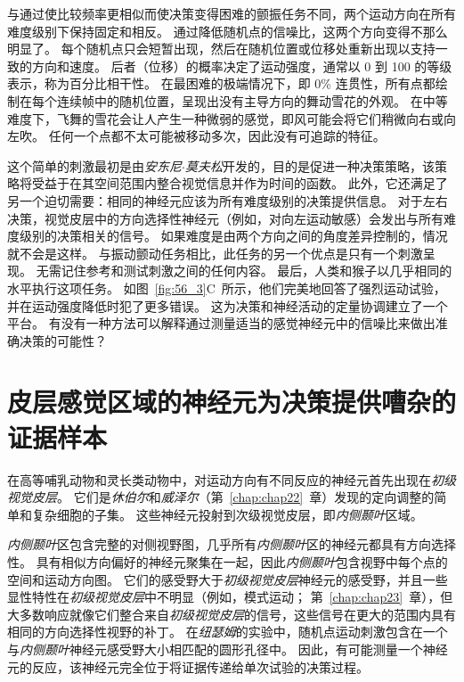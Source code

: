 与通过使比较频率更相似而使决策变得困难的颤振任务不同，两个运动方向在所有难度级别下保持固定和相反。
通过降低随机点的信噪比，这两个方向变得不那么明显了。
每个随机点只会短暂出现，然后在随机位置或位移处重新出现以支持一致的方向和速度。
后者（位移）的概率决定了运动强度，通常以 0 到 100 的等级表示，称为百分比相干性。
在最困难的极端情况下，即 0\% 连贯性，所有点都绘制在每个连续帧中的随机位置，呈现出没有主导方向的舞动雪花的外观。
在中等难度下，飞舞的雪花会让人产生一种微弱的感觉，即风可能会将它们稍微向右或向左吹。
任何一个点都不太可能被移动多次，因此没有可追踪的特征。


这个简单的刺激最初是由\textit{安东尼$\cdot$莫夫松}开发的，目的是促进一种决策策略，该策略将受益于在其空间范围内整合视觉信息并作为时间的函数。
此外，它还满足了另一个迫切需要：相同的神经元应该为所有难度级别的决策提供信息。
对于左右决策，视觉皮层中的方向选择性神经元（例如，对向左运动敏感）会发出与所有难度级别的决策相关的信号。
如果难度是由两个方向之间的角度差异控制的，情况就不会是这样。
与振动颤动任务相比，此任务的另一个优点是只有一个刺激呈现。
无需记住参考和测试刺激之间的任何内容。
最后，人类和猴子以几乎相同的水平执行这项任务。
如图~\ref{fig:56_3}C~所示，他们完美地回答了强烈运动试验，并在运动强度降低时犯了更多错误。
这为决策和神经活动的定量协调建立了一个平台。
有没有一种方法可以解释通过测量适当的感觉神经元中的信噪比来做出准确决策的可能性？



\section{皮层感觉区域的神经元为决策提供嘈杂的证据样本}

在高等哺乳动物和灵长类动物中，对运动方向有不同反应的神经元首先出现在\textit{初级视觉皮层}。
它们是\textit{休伯尔}和\textit{威泽尔}（第~\ref{chap:chap22}~章）发现的定向调整的简单和复杂细胞的子集。
这些神经元投射到次级视觉皮层，即\textit{内侧颞叶}区域。


\textit{内侧颞叶}区包含完整的对侧视野图，几乎所有\textit{内侧颞叶}区的神经元都具有方向选择性。
具有相似方向偏好的神经元聚集在一起，因此\textit{内侧颞叶}包含视野中每个点的空间和运动方向图。
它们的感受野大于\textit{初级视觉皮层}神经元的感受野，并且一些显性特性在\textit{初级视觉皮层}中不明显（例如，模式运动；
第~\ref{chap:chap23}~章），但大多数响应就像它们整合来自\textit{初级视觉皮层}的信号，这些信号在更大的范围内具有相同的方向选择性视野的补丁。
在\textit{纽瑟姆}的实验中，随机点运动刺激包含在一个与\textit{内侧颞叶}神经元感受野大小相匹配的圆形孔径中。
因此，有可能测量一个神经元的反应，该神经元完全位于将证据传递给单次试验的决策过程。


